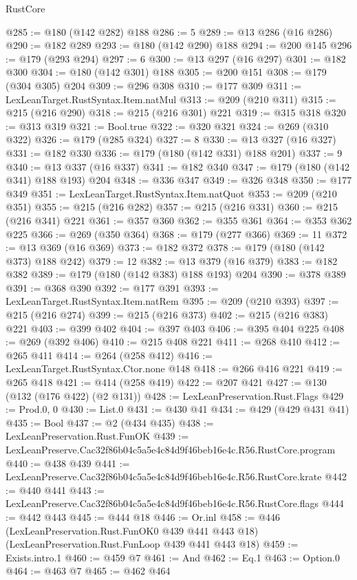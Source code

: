 \begin{lexlean}{RustCore}
\begin{coremodule}
@285 := @180 (@142 @282) @188
@286 := 5
@289 := @13 @286 (@16 @286)
@290 := @182 @289
@293 := @180 (@142 @290) @188
@294 := @200 @145
@296 := @179 (@293 @294)
@297 := 6
@300 := @13 @297 (@16 @297)
@301 := @182 @300
@304 := @180 (@142 @301) @188
@305 := @200 @151
@308 := @179 (@304 @305) @204
@309 := @296 @308
@310 := @177 @309
@311 := LexLeanTarget.RustSyntax.Item.natMul
@313 := @209 (@210 @311)
@315 := @215 (@216 @290)
@318 := @215 (@216 @301) @221
@319 := @315 @318
@320 := @313 @319
@321 := Bool.true
@322 := @320 @321
@324 := @269 (@310 @322)
@326 := @179 (@285 @324)
@327 := 8
@330 := @13 @327 (@16 @327)
@331 := @182 @330
@336 := @179 (@180 (@142 @331) @188 @201)
@337 := 9
@340 := @13 @337 (@16 @337)
@341 := @182 @340
@347 := @179 (@180 (@142 @341) @188 @193) @204
@348 := @336 @347
@349 := @326 @348
@350 := @177 @349
@351 := LexLeanTarget.RustSyntax.Item.natQuot
@353 := @209 (@210 @351)
@355 := @215 (@216 @282)
@357 := @215 (@216 @331)
@360 := @215 (@216 @341) @221
@361 := @357 @360
@362 := @355 @361
@364 := @353 @362 @225
@366 := @269 (@350 @364)
@368 := @179 (@277 @366)
@369 := 11
@372 := @13 @369 (@16 @369)
@373 := @182 @372
@378 := @179 (@180 (@142 @373) @188 @242)
@379 := 12
@382 := @13 @379 (@16 @379)
@383 := @182 @382
@389 := @179 (@180 (@142 @383) @188 @193) @204
@390 := @378 @389
@391 := @368 @390
@392 := @177 @391
@393 := LexLeanTarget.RustSyntax.Item.natRem
@395 := @209 (@210 @393)
@397 := @215 (@216 @274)
@399 := @215 (@216 @373)
@402 := @215 (@216 @383) @221
@403 := @399 @402
@404 := @397 @403
@406 := @395 @404 @225
@408 := @269 (@392 @406)
@410 := @215 @408 @221
@411 := @268 @410
@412 := @265 @411
@414 := @264 (@258 @412)
@416 := LexLeanTarget.RustSyntax.Ctor.none @148
@418 := @266 @416 @221
@419 := @265 @418
@421 := @414 (@258 @419)
@422 := @207 @421
@427 := @130 (@132 (@176 @422) (@2 @131))
@428 := LexLeanPreservation.Rust.Flags
@429 := Prod.{0, 0}
@430 := List.{0}
@431 := @430 @41
@434 := @429 (@429 @431 @41)
@435 := Bool
@437 := @2 (@434 @435)
@438 := LexLeanPreservation.Rust.FunOK
@439 := LexLeanPreserve.Cac32f86b04c5a5e4c84d9f46beb16e4c.R56.RustCore.program
@440 := @438 @439
@441 := LexLeanPreserve.Cac32f86b04c5a5e4c84d9f46beb16e4c.R56.RustCore.krate
@442 := @440 @441
@443 := LexLeanPreserve.Cac32f86b04c5a5e4c84d9f46beb16e4c.R56.RustCore.flags
@444 := @442 @443
@445 := @444 @18
@446 := Or.inl
@458 := @446
    (LexLeanPreservation.Rust.FunOK0 @439 @441 @443 @18)
    (LexLeanPreservation.Rust.FunLoop @439 @441 @443 @18)
@459 := Exists.intro.{1}
@460 := @459 @7
@461 := And
@462 := Eq.{1}
@463 := Option.{0}
@464 := @463 @7
@465 := @462 @464

\end{coremodule}
\end{lexlean}
